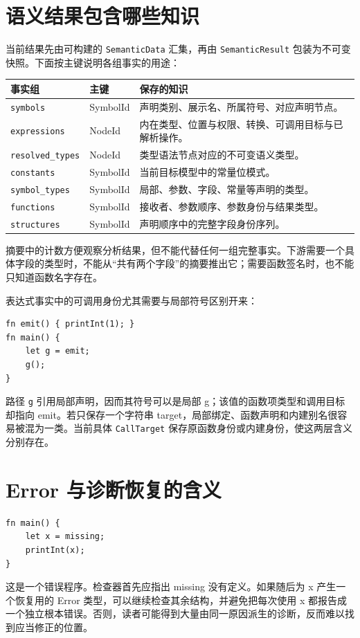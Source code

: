 \section{语义结果包含哪些知识}
当前结果先由可构建的 \texttt{SemanticData} 汇集，再由 \texttt{SemanticResult} 包装为不可变快照。下面按主键说明各组事实的用途：
\begin{longtable}{p{}p{}p{}}
\toprule
事实组 & 主键 & 保存的知识 \\
\midrule
\texttt{symbols} & SymbolId & 声明类别、展示名、所属符号、对应声明节点。\\
\texttt{expressions} & NodeId & 内在类型、位置与权限、转换、可调用目标与已解析操作。\\
\texttt{resolved\_types} & NodeId & 类型语法节点对应的不可变语义类型。\\
\texttt{constants} & SymbolId & 当前目标模型中的常量位模式。\\
\texttt{symbol\_types} & SymbolId & 局部、参数、字段、常量等声明的类型。\\
\texttt{functions} & SymbolId & 接收者、参数顺序、参数身份与结果类型。\\
\texttt{structures} & SymbolId & 声明顺序中的完整字段身份序列。\\
\bottomrule
\end{longtable}
摘要中的计数方便观察分析结果，但不能代替任何一组完整事实。下游需要一个具体字段的类型时，不能从“共有两个字段”的摘要推出它；需要函数签名时，也不能只知道函数名字存在。

表达式事实中的可调用身份尤其需要与局部符号区别开来：
\begin{lstlisting}[language=Rustless]
fn emit() { printInt(1); }
fn main() {
    let g = emit;
    g();
}
\end{lstlisting}
路径 \lstinline[language=Rustless]|g| 引用局部声明，因而其符号可以是局部 g；该值的函数项类型和调用目标却指向 emit。若只保存一个字符串 target，局部绑定、函数声明和内建别名很容易被混为一类。当前具体 \texttt{CallTarget} 保存原函数身份或内建身份，使这两层含义分别存在。

\section{Error 与诊断恢复的含义}
\begin{lstlisting}[language=Rustless]
fn main() {
    let x = missing;
    printInt(x);
}
\end{lstlisting}
这是一个错误程序。检查器首先应指出 missing 没有定义。如果随后为 x 产生一个恢复用的 Error 类型，可以继续检查其余结构，并避免把每次使用 x 都报告成一个独立根本错误。否则，读者可能得到大量由同一原因派生的诊断，反而难以找到应当修正的位置。

